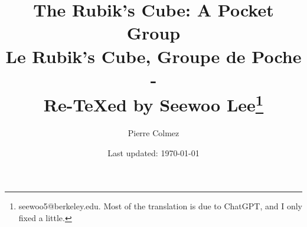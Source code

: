 \documentclass[letterpaper, 10pt]{article}
\begin{document}

\title{The Rubik's Cube: A Pocket Group \\[1em]
\normalsize Le Rubik's Cube, Groupe de Poche\\ - \\
\normalsize Re-\TeX ed by Seewoo Lee\footnote{seewoo5@berkeley.edu. Most of the translation is due to ChatGPT, and I only fixed a little.}}


\author{Pierre Colmez}
\date{\normalsize\vspace{-1ex} Last updated: \today}


\maketitle


















\end{document}
